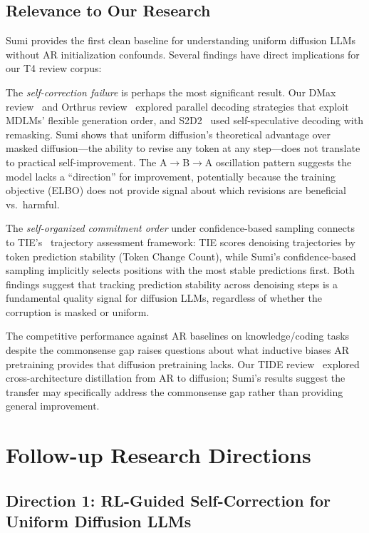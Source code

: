 \documentclass[11pt,a4paper]{article}
\begin{document}
\subsection{Relevance to Our Research}

Sumi provides the first clean baseline for understanding uniform diffusion LLMs without AR initialization confounds. Several findings have direct implications for our T4 review corpus:

The \emph{self-correction failure} is perhaps the most significant result. Our DMax review~\cite{huang2026dmax} and Orthrus review~\cite{wang2026orthrus} explored parallel decoding strategies that exploit MDLMs' flexible generation order, and S2D2~\cite{chen2026s2d2} used self-speculative decoding with remasking. Sumi shows that uniform diffusion's theoretical advantage over masked diffusion---the ability to revise any token at any step---does not translate to practical self-improvement. The A$\to$B$\to$A oscillation pattern suggests the model lacks a ``direction'' for improvement, potentially because the training objective (ELBO) does not provide signal about which revisions are beneficial vs.\ harmful.

The \emph{self-organized commitment order} under confidence-based sampling connects to TIE's~\cite{yun2026tie} trajectory assessment framework: TIE scores denoising trajectories by token prediction stability (Token Change Count), while Sumi's confidence-based sampling implicitly selects positions with the most stable predictions first. Both findings suggest that tracking prediction stability across denoising steps is a fundamental quality signal for diffusion LLMs, regardless of whether the corruption is masked or uniform.

The competitive performance against AR baselines on knowledge/coding tasks despite the commonsense gap raises questions about what inductive biases AR pretraining provides that diffusion pretraining lacks. Our TIDE review~\cite{li2026tide} explored cross-architecture distillation from AR to diffusion; Sumi's results suggest the transfer may specifically address the commonsense gap rather than providing general improvement.

\section{Follow-up Research Directions}

\subsection{Direction 1: RL-Guided Self-Correction for Uniform Diffusion LLMs}
\end{document}
